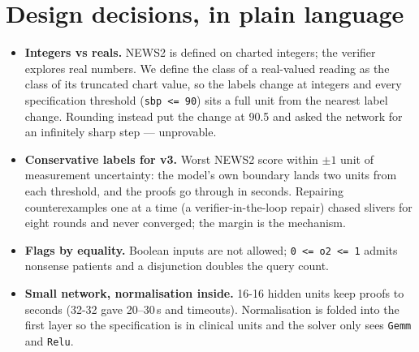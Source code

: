 \documentclass[11pt]{article}
\begin{document}
\section{Design decisions, in plain language}
\begin{itemize}
  \item \textbf{Integers vs reals.} NEWS2 is defined on charted integers; the verifier explores real numbers. We define the class of a real-valued reading as the class of its truncated chart value, so the labels change at integers and every specification threshold (\texttt{sbp <= 90}) sits a full unit from the nearest label change. Rounding instead put the change at 90.5 and asked the network for an infinitely sharp step — unprovable.
  \item \textbf{Conservative labels for v3.} Worst NEWS2 score within $\pm 1$ unit of measurement uncertainty: the model's own boundary lands two units from each threshold, and the proofs go through in seconds. Repairing counterexamples one at a time (a verifier-in-the-loop repair) chased slivers for eight rounds and never converged; the margin is the mechanism.
  \item \textbf{Flags by equality.} Boolean inputs are not allowed; \texttt{0 <= o2 <= 1} admits nonsense patients and a disjunction doubles the query count.
  \item \textbf{Small network, normalisation inside.} 16-16 hidden units keep proofs to seconds (32-32 gave 20–30\,s and timeouts). Normalisation is folded into the first layer so the specification is in clinical units and the solver only sees \texttt{Gemm} and \texttt{Relu}.
\end{itemize}
\end{document}
